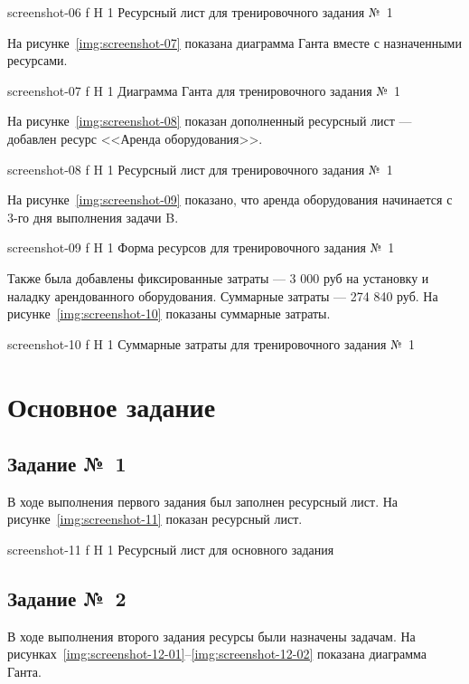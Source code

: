 \documentclass{bmstu}
\begin{document}
    {screenshot-06}
    {f}
    {H}
    {1\textwidth}
    {Ресурсный лист для тренировочного задания №~1}
    
На рисунке~\ref{img:screenshot-07} показана диаграмма Ганта вместе с назначенными ресурсами.
    
    {screenshot-07}
    {f}
    {H}
    {1\textwidth}
    {Диаграмма Ганта для тренировочного задания №~1}
    
На рисунке~\ref{img:screenshot-08} показан дополненный ресурсный лист --- добавлен ресурс <<Аренда оборудования>>.
    
    {screenshot-08}
    {f}
    {H}
    {1\textwidth}
    {Ресурсный лист для тренировочного задания №~1}
    
На рисунке~\ref{img:screenshot-09} показано, что аренда оборудования начинается с 3-го дня выполнения задачи B.
    
    {screenshot-09}
    {f}
    {H}
    {1\textwidth}
    {Форма ресурсов для тренировочного задания №~1}
    
Также была добавлены фиксированные затраты --- 3 000 руб на установку и наладку арендованного оборудования. 
Суммарные затраты --- 274 840 руб. 
На рисунке~\ref{img:screenshot-10} показаны суммарные затраты.
    
    {screenshot-10}
    {f}
    {H}
    {1\textwidth}
    {Суммарные затраты для тренировочного задания №~1}
    
\section{Основное задание}

\subsection{Задание №~1}

В ходе выполнения первого задания был заполнен ресурсный лист. 
На рисунке~\ref{img:screenshot-11} показан ресурсный лист.
    
    {screenshot-11}
    {f}
    {H}
    {1\textwidth}
    {Ресурсный лист для основного задания}

\subsection{Задание №~2}

В ходе выполнения второго задания ресурсы были назначены задачам. 
На рисунках~\ref{img:screenshot-12-01}--\ref{img:screenshot-12-02} показана диаграмма Ганта.
    
\end{document}

